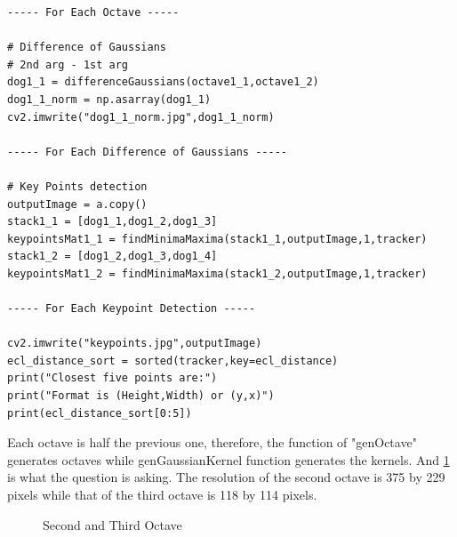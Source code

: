 \documentclass[12pt]{article}
\newenvironment{QandA}
{
	\begin{enumerate}[label=\normalfont\arabic*.,leftmargin=2em,rightmargin=2em]\normalfont
	}
	{
	\end{enumerate}
}
\newenvironment{codelalala}{}{}
\newenvironment{answered}{\setlength{\parindent}{1em}\par\normalfont}{}
\begin{document}
\begin{QandA}
\begin{answered}
\begin{codelalala}
\begin{verbatim}
----- For Each Octave -----

# Difference of Gaussians
# 2nd arg - 1st arg
dog1_1 = differenceGaussians(octave1_1,octave1_2)
dog1_1_norm = np.asarray(dog1_1)
cv2.imwrite("dog1_1_norm.jpg",dog1_1_norm)

----- For Each Difference of Gaussians -----

# Key Points detection
outputImage = a.copy()
stack1_1 = [dog1_1,dog1_2,dog1_3]
keypointsMat1_1 = findMinimaMaxima(stack1_1,outputImage,1,tracker)
stack1_2 = [dog1_2,dog1_3,dog1_4]
keypointsMat1_2 = findMinimaMaxima(stack1_2,outputImage,1,tracker)

----- For Each Keypoint Detection -----

cv2.imwrite("keypoints.jpg",outputImage)
ecl_distance_sort = sorted(tracker,key=ecl_distance)
print("Closest five points are:")
print("Format is (Height,Width) or (y,x)")
print(ecl_distance_sort[0:5])
\end{verbatim}
\end{codelalala}
Each octave is half the previous one, therefore, the function of "genOctave" generates octaves while genGaussianKernel function generates the kernels. And {\ref{2nd-3rd-oct}} is what the question is asking. The resolution of the second octave is 375 by 229 pixels while that of the third octave is 118 by 114 pixels. 
\\
\begin{figure}
		\centering
  			\caption{Second and Third Octave}
  		\label{2nd-3rd-oct}
\end{figure}

\end{answered}
\end{QandA}
\end{document}
